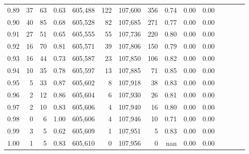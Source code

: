\begin{tabular}{rrrcrrrrrrrrrrr}
0.89 &      37 &     63 &                                       0.63 &  605,488 &      122 &  107,600 &      356 &  0.74 &  0.00 &                         0.00 \\
0.90 &      40 &     85 &                                       0.68 &  605,528 &       82 &  107,685 &      271 &  0.77 &  0.00 &                         0.00 \\
0.91 &      27 &     51 &                                       0.65 &  605,555 &       55 &  107,736 &      220 &  0.80 &  0.00 &                         0.00 \\
0.92 &      16 &     70 &                                       0.81 &  605,571 &       39 &  107,806 &      150 &  0.79 &  0.00 &                         0.00 \\
0.93 &      16 &     44 &                                       0.73 &  605,587 &       23 &  107,850 &      106 &  0.82 &  0.00 &                         0.00 \\
0.94 &      10 &     35 &                                       0.78 &  605,597 &       13 &  107,885 &       71 &  0.85 &  0.00 &                         0.00 \\
0.95 &       5 &     33 &                                       0.87 &  605,602 &        8 &  107,918 &       38 &  0.83 &  0.00 &                         0.00 \\
0.96 &       2 &     12 &                                       0.86 &  605,604 &        6 &  107,930 &       26 &  0.81 &  0.00 &                         0.00 \\
0.97 &       2 &     10 &                                       0.83 &  605,606 &        4 &  107,940 &       16 &  0.80 &  0.00 &                         0.00 \\
0.98 &       0 &      6 &                                       1.00 &  605,606 &        4 &  107,946 &       10 &  0.71 &  0.00 &                         0.00 \\
0.99 &       3 &      5 &                                       0.62 &  605,609 &        1 &  107,951 &        5 &  0.83 &  0.00 &                         0.00 \\
1.00 &       1 &      5 &                                       0.83 &  605,610 &        0 &  107,956 &        0 &   nan &  0.00 &                         0.00 \\
\bottomrule
\end{tabular}
